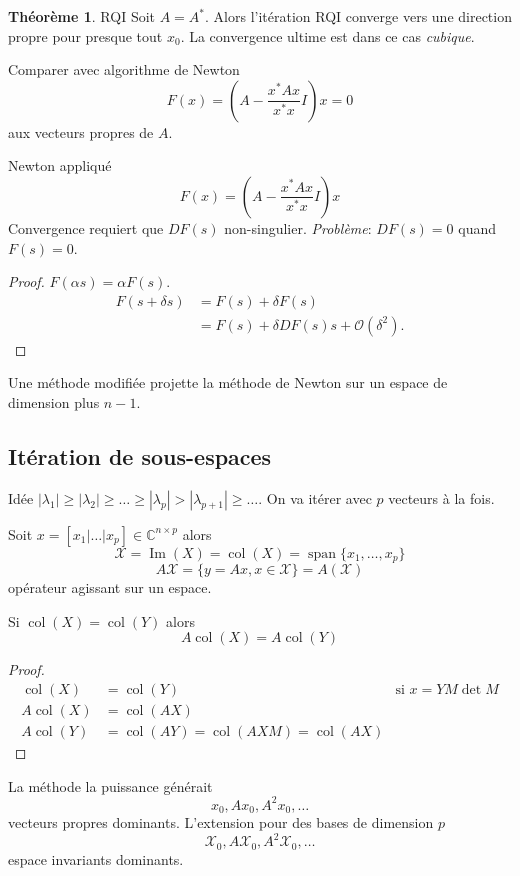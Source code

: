 \documentclass[11pt,a4paper]{article}
\newcommand{\C}{\mathbb{C}}
\theoremstyle{definition}
\newtheorem{mytheo}[mydef]{Théorème}
\newcommand{\bigoh}{\mathcal{O}}
\DeclareMathOperator{\myspan}{span}
\DeclareMathOperator{\col}{col}
\DeclareMathOperator{\myim}{Im}
\begin{document}
\begin{mytheo}{RQI}
  Soit $A = A^*$. Alors l'itération RQI converge vers une direction propre pour presque tout $x_0$.
  La convergence ultime est dans ce cas \emph{cubique}.
\end{mytheo}

Comparer avec algorithme de Newton
$$F(x) = \left(A - \frac{x^*Ax}{x^*x} I\right) x = 0$$
aux vecteurs propres de $A$.

Newton appliqué
$$F(x) = \left(A - \frac{x^*Ax}{x^*x} I\right) x$$
Convergence requiert que $DF(s)$ non-singulier.
\emph{Problème}: $DF(s) = 0$ quand $F(s) = 0$.
\begin{proof}
  $F(\alpha s) = \alpha F(s)$.
  \begin{align*}
    F(s + \delta s) & = F(s) + \delta F(s)\\
                    & = F(s) + \delta DF(s) s + \bigoh(\delta^2).
  \end{align*}
\end{proof}

Une méthode modifiée projette la méthode de Newton sur un espace de dimension plus $n-1$.

\subsection{Itération de sous-espaces}
Idée $|\lambda_1| \geq |\lambda_2| \geq \ldots \geq |\lambda_p| > |\lambda_{p+1}| \geq \ldots $.
On va itérer avec $p$ vecteurs à la fois.

Soit $x = [x_1|\ldots|x_p] \in \C^{n \times p}$ alors
$$\mathcal{X} = \myim(X) = \col(X) = \myspan\{x_1,\ldots,x_p\}$$
$$A\mathcal{X} = \{y = Ax, x \in \mathcal{X}\} = A(\mathcal{X})$$
opérateur agissant sur un espace.

Si $\col(X) = \col(Y)$ alors
$$A \col(X) = A \col(Y)$$
\begin{proof}
  \begin{align*}
    \col(X) & = \col(Y) & \text{si } x = YM\det M\\
    A \col(X) & =\col(AX)\\
    A \col(Y) & = \col(AY) = \col(AXM) = \col(AX)
  \end{align*}
\end{proof}

La méthode la puissance générait
$$x_0,Ax_0,A^2x_0,\ldots$$
vecteurs propres dominants.
L'extension pour des bases de dimension $p$
$$\mathcal{X}_0,A\mathcal{X}_0,A^2\mathcal{X_0},\ldots$$
espace invariants dominants.
\end{document}
